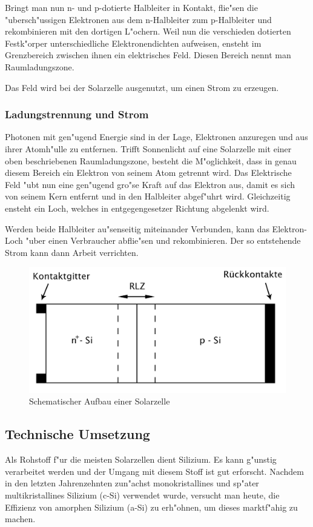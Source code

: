 			Bringt man nun n- und p-dotierte Halbleiter in Kontakt, flie"sen die "ubersch"ussigen Elektronen aus dem n-Halbleiter zum p-Halbleiter und rekombinieren mit den dortigen L"ochern.
			Weil nun die verschieden dotierten Festk"orper unterschiedliche Elektronendichten aufweisen, ensteht im Grenzbereich zwischen ihnen ein elektrisches Feld.
			Diesen Bereich nennt man Raumladungszone.

			Das Feld wird bei der Solarzelle ausgenutzt, um einen Strom zu erzeugen.

		\subsubsection{Ladungstrennung und Strom}
			\label{subsub:ladungstrennung}
			Photonen mit gen"ugend Energie sind in der Lage, Elektronen anzuregen und aus ihrer Atomh"ulle zu entfernen.
			Trifft Sonnenlicht auf eine Solarzelle mit einer oben beschriebenen Raumladungszone, besteht die M"oglichkeit, dass in genau diesem Bereich ein Elektron von seinem Atom getrennt wird.
			Das Elektrische Feld "ubt nun eine gen"ugend gro"se Kraft auf das Elektron aus, damit es sich von seinem Kern entfernt und in den Halbleiter abgef"uhrt wird.
			Gleichzeitig ensteht ein Loch, welches in entgegengesetzer Richtung abgelenkt wird.

			Werden beide Halbleiter au"senseitig miteinander Verbunden, kann das Elektron-Loch "uber einen Verbraucher abflie"sen und rekombinieren.
			Der so entstehende Strom kann dann Arbeit verrichten.

		\begin{figure}[h]
			\centering
			\includegraphics[width = 15cm]{img/diode_neu.jpg}
			\caption{Schematischer Aufbau einer Solarzelle}
			\label{fig:diode}
		\end{figure}

	\subsection{Technische Umsetzung}
		\label{sub:umsetzung}
		Als Rohstoff f"ur die meisten Solarzellen dient Silizium.
		Es kann g"unstig verarbeitet werden und der Umgang mit diesem Stoff ist gut erforscht.
		Nachdem in den letzten Jahrenzehnten zun"achst monokristallines und sp"ater multikristallines Silizium (c-Si) verwendet wurde,
		versucht man heute, die Effizienz von amorphen Silizium (a-Si) zu erh"ohnen, um dieses marktf"ahig zu machen.

